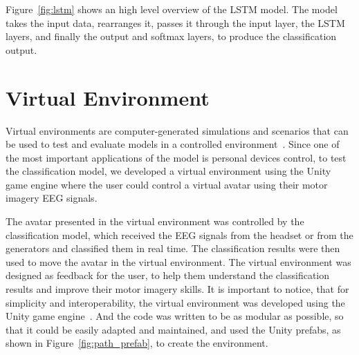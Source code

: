 Figure~\ref{fig:lstm} shows an high level overview of the LSTM model.
The model takes the input data, rearranges it, passes it through the input layer, the LSTM layers, and finally the output and softmax layers, to produce the classification output.

\section{Virtual Environment}
Virtual environments are computer-generated simulations and scenarios that can be used to test and evaluate models in a controlled environment~\cite{ellis1994virtual}.
Since one of the most important applications of the model is personal devices control, to test the classification model, we developed a virtual environment using the Unity game engine where the user could control a virtual avatar using their motor imagery EEG signals.

The avatar presented in the virtual environment was controlled by the classification model, which received the EEG signals from the headset or from the generators and classified them in real time.
The classification results were then used to move the avatar in the virtual environment.
The virtual environment was designed as feedback for the user, to help them understand the classification results and improve their motor imagery skills.
It is important to notice, that for simplicity and interoperability, the virtual environment was developed using the Unity game engine~\cite{haas2014history}.
And the code was written to be as modular as possible, so that it could be easily adapted and maintained, and used the Unity prefabs, as shown in Figure~\ref{fig:path_prefab}, to create the environment.

